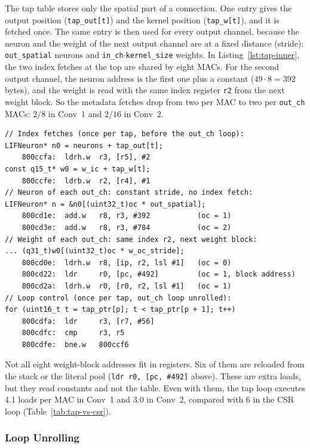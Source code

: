 The tap table stores only the spatial part of a connection. One entry gives the output position
(\texttt{tap\_out[t]}) and the kernel position (\texttt{tap\_w[t]}), and it is fetched once.
The same entry is then used for every output channel, because the neuron and the weight of the
next output channel are at a fixed distance (stride): \texttt{out\_spatial} neurons and
\texttt{in\_ch}$\cdot$\texttt{kernel\_size} weights. In Listing~\ref{lst:tap-inner}, the two
index fetches at the top are shared by eight MACs. For the second output channel, the neuron
address is the first one plus a constant ($49 \cdot 8 = 392$\,bytes), and the weight is read with
the same index register \texttt{r2} from the next weight block. So the metadata fetches drop from
two per MAC to two per \texttt{out\_ch} MACs: $2/8$ in Conv~1 and $2/16$ in Conv~2.

\begin{lstlisting}[basicstyle=\ttfamily\scriptsize, columns=fullflexible, keepspaces=true,
    frame=single, caption={Tap kernel in Conv~1: index fetches and loop control once per tap,
    shared by the eight unrolled output channels.},
    label={lst:tap-inner}]
// Index fetches (once per tap, before the out_ch loop):
LIFNeuron* n0 = neurons + tap_out[t];
    800ccfa:  ldrh.w  r3, [r5], #2
const q15_t* w0 = w_ic + tap_w[t];
    800ccfe:  ldrb.w  r2, [r4], #1
// Neuron of each out_ch: constant stride, no index fetch:
LIFNeuron* n = &n0[(uint32_t)oc * out_spatial];
    800cd1e:  add.w   r8, r3, #392           (oc = 1)
    800cd3e:  add.w   r8, r3, #784           (oc = 2)
// Weight of each out_ch: same index r2, next weight block:
... (q31_t)w0[(uint32_t)oc * w_oc_stride];
    800cd0e:  ldrh.w  r8, [ip, r2, lsl #1]   (oc = 0)
    800cd22:  ldr     r0, [pc, #492]         (oc = 1, block address)
    800cd2a:  ldrh.w  r0, [r0, r2, lsl #1]   (oc = 1)
// Loop control (once per tap, out_ch loop unrolled):
for (uint16_t t = tap_ptr[p]; t < tap_ptr[p + 1]; t++)
    800cdfa:  ldr     r3, [r7, #56]
    800cdfc:  cmp     r3, r5
    800cdfe:  bne.w   800ccf6
\end{lstlisting}

Not all eight weight-block addresses fit in registers. Six of them are reloaded from the stack
or the literal pool (\texttt{ldr r0, [pc, \#492]} above). These are extra loads, but they read
constants and not the table. Even with them, the tap loop executes 4.1 loads per MAC in Conv~1
and 3.0 in Conv~2, compared with 6 in the CSR loop (Table~\ref{tab:tap-vs-csr}).

\subsubsection*{Loop Unrolling}

